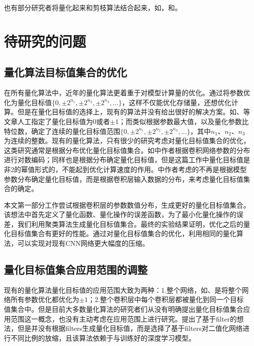 \documentclass[ pdftex, oneside, master]{NJUthesis}
\begin{document}
也有部分研究者将量化起来和剪枝算法结合起来，如\cite{nipsq73}，\cite{iclrq82}和\cite{icmlq83}。

\section{待研究的问题}

\subsection{量化算法目标值集合的优化}

在所有量化算法中，近年的量化算法更着重于对模型计算量的优化。通过将参数优化为量化目标值$\{0,\pm2^{n_1}, \pm2^{n_2}, \pm2^{n_3}, \dots\}$，这样不仅能优化存储量，还想优化计算。但是在量化目标值的选择上，现有的算法并没有给出很好的解决方案。如\cite{binary}、\cite{ternary}等文章人工指定了量化目标值为0或者$\pm1$；而类似\cite{incremental}根据参数最大值，以及量化参数比特位数，确定了连续的量化目标值范围$\{0,\pm2^{n_1}, \pm2^{n_2}, \pm2^{n_3}, \dots\}$，其中$n_1$、$n_2$、$n_3$为连续的整数。现有的量化算法，只有很少的研究考虑对量化目标值集合的优化，这类研究通常是根据分布优化量化目标值集合。如\cite{icasspq71}中作者根据卷积网络参数的分布进行对数编码；\cite{eccvq86}同样也是根据分布确定量化目标值，但是这篇工作中量化目标值是非2的幂值形式的，不能起到优化计算速度的作用。\cite{eccvq87}中作者考虑的不再是根据模型参数分布确定量化目标值，而是根据卷积层输入数据的分布，来考虑量化目标值集合的确定。

本文第一部分工作尝试根据卷积层的参数数值分布，生成更好的量化目标值集合。该想法中首先定义了量化函数、量化操作的误差函数，为了最小化量化操作的误差，我们利用聚类算法生成量化目标值集合。最终的实验结果证明，优化之后的量化目标值集合有更好的性能。通过对量化目标值集合的优化，利用相同的量化算法，可以实现对现有CNN网络更大幅度的压缩。

\subsection{量化目标值集合应用范围的调整}

现有的量化算法量化目标值的应用范围大致为两种：1.整个网络，如\cite{binary}、\cite{ternary}是将整个网络所有参数优化都优化为$\pm1$；2.整个卷积层\cite{incremental}中每个卷积层都被量化到同一个目标值集合中。但是目前大多数量化算法的研究者们从没有明确提出量化目标值集合应用范围这一概念，也没有主动考虑在应用范围上进行研究。\cite{cvprq71}提出了基于filter的想法，但是并没有根据filters生成量化目标值，而是选择了基于filters对二值化网络进行不同比例的放缩，且该算法依赖于与训练好的深度学习模型。
\end{document}
